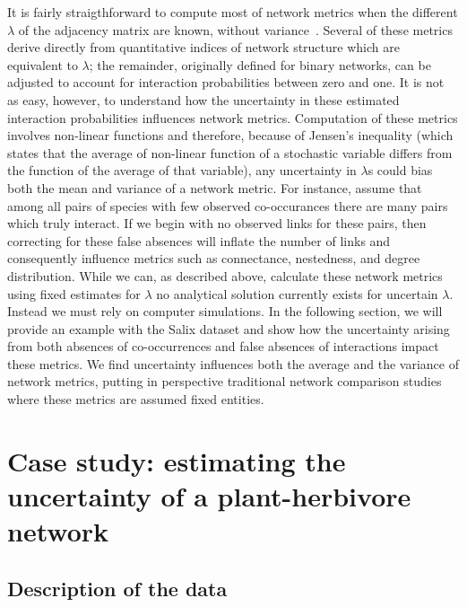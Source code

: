 \documentclass[12pt]{article}
\begin{document}
    It is fairly straigthforward to compute most of network metrics when the different $\lambda$ of the adjacency matrix are known, without variance~\citep{Poisot2016}. Several of these metrics derive directly from quantitative indices of network structure which are equivalent to $\lambda$; the remainder, originally defined for binary networks, can be adjusted to account for interaction probabilities between zero and one. It is not as easy, however, to understand how the uncertainty in these estimated interaction probabilities influences network metrics. Computation of these metrics involves non-linear functions and therefore, because of Jensen's inequality (which states that the average of non-linear function of a stochastic variable differs from the function of the average of that variable), any uncertainty in $\lambda$s could bias both the mean and variance of a network metric. For instance, assume that among all pairs of species with few observed co-occurances there are many pairs which truly interact.    If we begin with no observed links for these pairs, then correcting for these false absences will inflate the number of links and consequently influence metrics such as connectance, nestedness, and degree distribution. While we can, as described above, calculate these network metrics using fixed estimates for $\lambda$ no analytical solution currently exists for uncertain $\lambda$. Instead we must rely on computer simulations. In the following section, we will provide an example with the Salix dataset and show how the uncertainty arising from both absences of co-occurrences and false absences of interactions impact these metrics. We find uncertainty influences both the average and the variance of network metrics, putting in perspective traditional network comparison studies where these metrics are assumed fixed entities. 

\section*{Case study: estimating the uncertainty of a plant-herbivore network}

    \subsection*{Description of the data}
\end{document}
